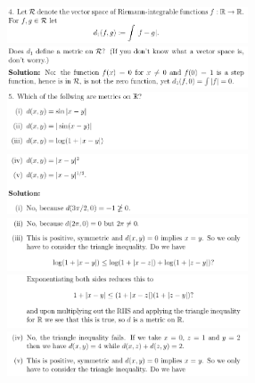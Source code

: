 \documentclass[8pt,landscape]{article}
\begin{document}
\begin{multicols}{3}
    \includegraphics[width=270]{058.png} \\
    \includegraphics[width=270]{059.png} \\
    \includegraphics[width=270]{060.png} \\
    \includegraphics[width=270]{061.png} \\
    \includegraphics[width=270]{062.png} \\
    \includegraphics[width=270]{063.png} \\
    \includegraphics[width=270]{064.png} \\

\end{multicols}
\end{document}
